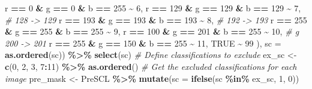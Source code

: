 \documentclass[
]{article}
\newenvironment{Shaded}{\begin{snugshade}}{\end{snugshade}}
\newcommand{\AttributeTok}[1]{\textcolor[rgb]{0.13,0.29,0.53}{#1}}
\newcommand{\CommentTok}[1]{\textcolor[rgb]{0.56,0.35,0.01}{\textit{#1}}}
\newcommand{\ConstantTok}[1]{\textcolor[rgb]{0.56,0.35,0.01}{#1}}
\newcommand{\DecValTok}[1]{\textcolor[rgb]{0.00,0.00,0.81}{#1}}
\newcommand{\FunctionTok}[1]{\textcolor[rgb]{0.13,0.29,0.53}{\textbf{#1}}}
\newcommand{\NormalTok}[1]{#1}
\newcommand{\OtherTok}[1]{\textcolor[rgb]{0.56,0.35,0.01}{#1}}
\newcommand{\SpecialCharTok}[1]{\textcolor[rgb]{0.81,0.36,0.00}{\textbf{#1}}}
\begin{document}
\begin{Shaded}
\begin{Highlighting}[]
\NormalTok{            r }\SpecialCharTok{==} \DecValTok{0} \SpecialCharTok{\&}\NormalTok{ g }\SpecialCharTok{==} \DecValTok{0} \SpecialCharTok{\&}\NormalTok{ b }\SpecialCharTok{==} \DecValTok{255} \SpecialCharTok{\textasciitilde{}} \DecValTok{6}\NormalTok{, }
\NormalTok{            r }\SpecialCharTok{==} \DecValTok{129} \SpecialCharTok{\&}\NormalTok{ g }\SpecialCharTok{==} \DecValTok{129} \SpecialCharTok{\&}\NormalTok{ b }\SpecialCharTok{==} \DecValTok{129} \SpecialCharTok{\textasciitilde{}} \DecValTok{7}\NormalTok{,   }\CommentTok{\#  128 {-}\textgreater{} 129}
\NormalTok{            r }\SpecialCharTok{==} \DecValTok{193} \SpecialCharTok{\&}\NormalTok{ g }\SpecialCharTok{==} \DecValTok{193} \SpecialCharTok{\&}\NormalTok{ b }\SpecialCharTok{==} \DecValTok{193} \SpecialCharTok{\textasciitilde{}} \DecValTok{8}\NormalTok{,   }\CommentTok{\#  192 {-}\textgreater{} 193}
\NormalTok{            r }\SpecialCharTok{==} \DecValTok{255} \SpecialCharTok{\&}\NormalTok{ g }\SpecialCharTok{==} \DecValTok{255} \SpecialCharTok{\&}\NormalTok{ b }\SpecialCharTok{==} \DecValTok{255} \SpecialCharTok{\textasciitilde{}} \DecValTok{9}\NormalTok{, }
\NormalTok{            r }\SpecialCharTok{==} \DecValTok{100} \SpecialCharTok{\&}\NormalTok{ g }\SpecialCharTok{==} \DecValTok{201} \SpecialCharTok{\&}\NormalTok{ b }\SpecialCharTok{==} \DecValTok{255} \SpecialCharTok{\textasciitilde{}} \DecValTok{10}\NormalTok{,  }\CommentTok{\# g 200 {-}\textgreater{} 201}
\NormalTok{            r }\SpecialCharTok{==} \DecValTok{255} \SpecialCharTok{\&}\NormalTok{ g }\SpecialCharTok{==} \DecValTok{150} \SpecialCharTok{\&}\NormalTok{ b }\SpecialCharTok{==} \DecValTok{255} \SpecialCharTok{\textasciitilde{}} \DecValTok{11}\NormalTok{, }
            \ConstantTok{TRUE} \SpecialCharTok{\textasciitilde{}} \DecValTok{99}\NormalTok{ ), }
            \AttributeTok{sc =} \FunctionTok{as.ordered}\NormalTok{(sc)) }\SpecialCharTok{\%\textgreater{}\%}
          \FunctionTok{select}\NormalTok{(sc)}
        \CommentTok{\# Define classifications to exclude}
\NormalTok{          ex\_sc }\OtherTok{\textless{}{-}} \FunctionTok{c}\NormalTok{(}\DecValTok{0}\NormalTok{, }\DecValTok{2}\NormalTok{, }\DecValTok{3}\NormalTok{, }\DecValTok{7}\SpecialCharTok{:}\DecValTok{11}\NormalTok{) }\SpecialCharTok{\%\textgreater{}\%} \FunctionTok{as.ordered}\NormalTok{() }
        \CommentTok{\# Get the excluded classifications for each image}
\NormalTok{          pre\_mask }\OtherTok{\textless{}{-}} 
\NormalTok{            PreSCL }\SpecialCharTok{\%\textgreater{}\%}
            \FunctionTok{mutate}\NormalTok{(}\AttributeTok{sc =} \FunctionTok{ifelse}\NormalTok{(sc }\SpecialCharTok{\%in\%}\NormalTok{ ex\_sc, }\DecValTok{1}\NormalTok{, }\DecValTok{0}\NormalTok{)) }

\end{Highlighting}
\end{Shaded}
\end{document}
